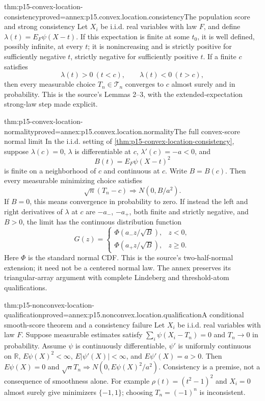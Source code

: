 \begin{hbtheorem}{thm:p15-convex-location-consistency}{proved=annex:p15.convex.location.consistency}{The population score and strong consistency}
Let \(X_i\) be i.i.d. real variables with law \(F\), and define
\(\lambda(t)=E_F\psi(X-t)\). If this expectation is finite at some
\(t_0\), it is well defined, possibly infinite, at every \(t\);
it is nonincreasing and is strictly positive for sufficiently negative
\(t\), strictly negative for sufficiently positive \(t\).
If a finite \(c\) satisfies
\[
 \lambda(t)>0\ (t<c),\qquad \lambda(t)<0\ (t>c),
\]
then every measurable choice \(T_n\in\mathcal T_n\) converges to \(c\)
almost surely and in probability. This is the source's Lemmas 2--3,
with the extended-expectation strong-law step made explicit.
\end{hbtheorem}

\begin{hbtheorem}{thm:p15-convex-location-normality}{proved=annex:p15.convex.location.normality}{The full convex-score normal limit}
In the i.i.d. setting of \cref{thm:p15-convex-location-consistency},
suppose \(\lambda(c)=0\), \(\lambda\) is differentiable at \(c\),
\(\lambda'(c)=-a<0\), and
\[
 B(t)=E_F\psi(X-t)^2
\]
is finite on a neighborhood of \(c\) and continuous at \(c\).
Write \(B=B(c)\). Then every measurable minimizing choice satisfies
\[
 \sqrt n(T_n-c)\Rightarrow N(0,B/a^2).
\]
If \(B=0\), this means convergence in probability to zero.
If instead the left and right derivatives of \(\lambda\) at \(c\)
are \(-a_-\), \(-a_+\), both finite and strictly negative, and \(B>0\),
the limit has the continuous distribution function
\[
 G(z)=
 \begin{cases}
 \Phi(a_-z/\sqrt B),&z<0,\\
 \Phi(a_+z/\sqrt B),&z\geq0.
 \end{cases}
\]
Here \(\Phi\) is the standard normal CDF. This is the source's
two-half-normal extension; it need not be a centered normal law.
The annex preserves its triangular-array argument with complete
Lindeberg and threshold-atom qualifications.
\end{hbtheorem}

\begin{hbtheorem}{thm:p15-nonconvex-location-qualification}{proved=annex:p15.nonconvex.location.qualification}{A conditional smooth-score theorem and a consistency failure}
Let \(X_i\) be i.i.d. real variables with law \(F\). Suppose measurable estimates satisfy
\(\sum_i\psi(X_i-T_n)=0\) and \(T_n\to0\) in probability.
Assume \(\psi\) is continuously differentiable, \(\psi'\) is uniformly
continuous on \(\mathbb R\), \(E\psi(X)^2<\infty\),
\(E|\psi'(X)|<\infty\), and \(E\psi'(X)=a>0\).
Then \(E\psi(X)=0\) and
\(\sqrt n T_n\Rightarrow N(0,E\psi(X)^2/a^2)\).
Consistency is a premise, not a consequence of smoothness alone.
For example \(\rho(t)=(t^2-1)^2\) and \(X_i=0\) almost surely give
minimizers \(\{-1,1\}\); choosing \(T_n=(-1)^n\) is inconsistent.
\end{hbtheorem}

